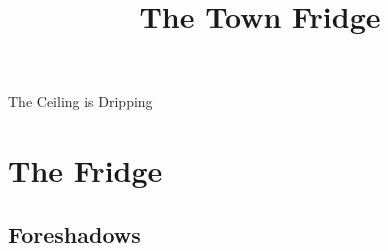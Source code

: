 \documentclass[a4paper,openany]{book}
\title{The Town Fridge}
\begin{document}
%
  {The Ceiling is Dripping}%

\glsunsetall


\printglossary[
  style=topicmcols,
  ]

\printglossary[
  type=mech,
  style=topicmcols,
  ]

\mainmatter
\glsresetall

\chapter{The Fridge}

\section{Foreshadows}

\begin{multicols}{2}
  
\end{multicols}

\stopcontents[segments]



\backmatter
\end{document}
